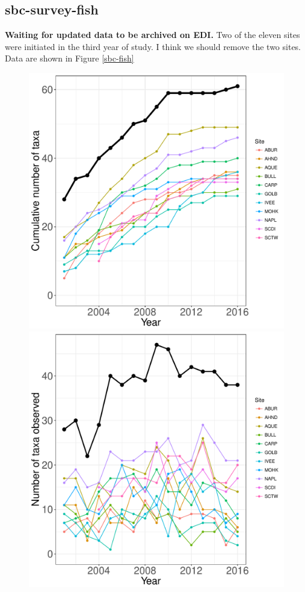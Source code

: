 \documentclass[11pt, oneside]{article}
\begin{document}
\subsection {sbc-survey-fish}
{\bf  Waiting for updated data to be archived on EDI.}
Two of the eleven sites were initiated in the third year of study.
I think we should remove the two sites.
Data are shown in Figure \ref{sbc-fish}
\begin{figure}[h!]
\centering
\includegraphics[scale = 0.4]{sbc-fish-castorani_species_accumulation_curve.pdf}
\includegraphics[scale = 0.4]{sbc-fish-castorani_num_taxa_over_time.pdf}

\end{figure}
\end{document}
